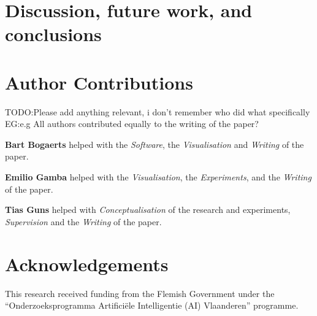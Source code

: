 \documentclass[3p]{elsarticle}
\newcommand\comment[1]{\marginpar{\tiny #1}}
\renewcommand\comment[1]{#1}
\newcommand{\emilio}[1]{{\comment{\color{red}\textsc{EG:}#1}}}
\newcommand{\todo}[1]{{\comment{\color{red}\textsc{TODO:}#1}}}
\begin{document}
\section{Discussion, future work, and conclusions}\label{sec:conclusion}


\section*{Author Contributions}
\todo{Please add anything relevant, i don't remember who did what specifically}
\emilio{e.g All authors contributed equally to the writing of the paper?}

\noindent\textbf{Bart Bogaerts} helped with the \textit{Software}, the \textit{Visualisation} and \textit{Writing} of the paper.

\noindent\textbf{Emilio Gamba} helped with the \textit{Visualisation}, the \textit{Experiments}, and the \textit{Writing} of the paper.

\noindent\textbf{Tias Guns} helped with \textit{Conceptualisation} of the research and experiments, \textit{Supervision} and the \textit{Writing} of the paper.

\section*{Acknowledgements}
This research received funding from the Flemish Government under the ``Onderzoeksprogramma Artifici\"ele Intelligentie (AI) Vlaanderen'' programme.



\end{document}
